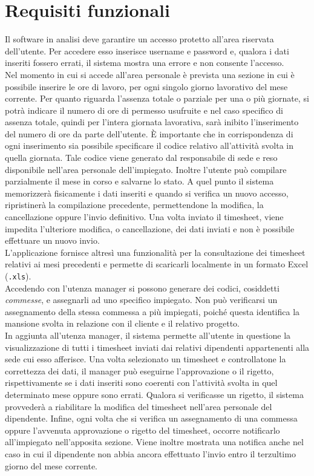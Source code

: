 \section{Requisiti funzionali}
Il software in analisi deve garantire un accesso protetto all'area riservata dell'utente. Per accedere esso inserisce username e password e, qualora i dati inseriti fossero errati, il sistema mostra una errore e non consente l'accesso. \\
Nel momento in cui si accede all'area personale è prevista una sezione in cui è possibile inserire le ore di lavoro, per ogni singolo giorno lavorativo del mese corrente. Per quanto riguarda l'assenza totale o parziale per una o più giornate, si potrà indicare il numero di ore di permesso usufruite e nel caso specifico di assenza totale, quindi per l'intera giornata lavorativa, sarà inibito l'inserimento del numero di ore da parte dell'utente. È importante che in corrispondenza di ogni inserimento sia possibile specificare il codice relativo all'attività svolta in quella giornata. Tale codice viene generato dal responsabile di sede e reso disponibile nell'area personale dell'impiegato. Inoltre l'utente può compilare parzialmente il mese in corso e salvarne lo stato. A quel punto il sistema memorizzerà fisicamente i dati inseriti e quando si verifica un nuovo accesso, ripristinerà la compilazione precedente, permettendone la modifica, la cancellazione oppure l'invio definitivo. Una volta inviato il timesheet, viene impedita l'ulteriore modifica, o cancellazione, dei dati inviati e non è possibile effettuare un nuovo invio. \\
L'applicazione fornisce altresì una funzionalità per la consultazione dei timesheet relativi ai mesi precedenti e permette di scaricarli localmente in un formato Excel (\texttt{.xls}). \\
Accedendo con l'utenza manager si possono generare dei codici, cosiddetti \textit{commesse}, e assegnarli ad uno specifico impiegato. Non può verificarsi un assegnamento della stessa commessa a più impiegati, poiché questa identifica la mansione svolta in relazione con il cliente e il relativo progetto.\\
In aggiunta all'utenza manager, il sistema permette all'utente in questione la visualizzazione di tutti i timesheet inviati dai relativi dipendenti appartenenti alla sede cui esso afferisce. Una volta selezionato un timesheet e controllatone la correttezza dei dati, il manager può eseguirne l'approvazione o il rigetto, rispettivamente se i dati inseriti sono coerenti con l'attività svolta in quel determinato mese oppure sono errati. Qualora si verificasse un rigetto, il sistema provvederà a riabilitare la modifica del timesheet nell'area personale del dipendente. Infine, ogni volta che si verifica un assegnamento di una commessa oppure l'avvenuta approvazione o rigetto del timesheet, occorre notificarlo all'impiegato nell'apposita sezione. Viene inoltre mostrata una notifica anche nel caso in cui il dipendente non abbia ancora effettuato l'invio entro il terzultimo giorno del mese corrente.

